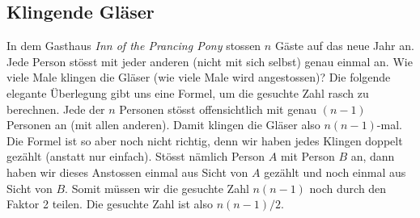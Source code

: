 \subsection{Klingende Gläser}
In dem Gasthaus \textit{Inn of the Prancing Pony} stossen $n$ Gäste auf das neue Jahr an. Jede Person stösst mit jeder anderen (nicht mit sich selbst) genau einmal an. Wie viele Male klingen die Gläser (wie viele Male wird angestossen)? Die folgende elegante Überlegung gibt uns eine Formel, um die gesuchte Zahl rasch zu berechnen. Jede der $n$ Personen stösst offensichtlich mit genau $(n-1)$ Personen an (mit allen anderen). Damit klingen die Gläser also $n(n-1)$-mal. Die Formel ist so aber noch nicht richtig, denn wir haben jedes Klingen doppelt gezählt (anstatt nur einfach). Stösst nämlich Person $A$ mit Person $B$ an, dann haben wir dieses Anstossen einmal aus Sicht von $A$ gezählt und noch einmal aus Sicht von $B$. Somit müssen wir die gesuchte Zahl $n(n-1)$ noch durch den Faktor 2 teilen. Die gesuchte Zahl ist also $n(n-1)/2$.

